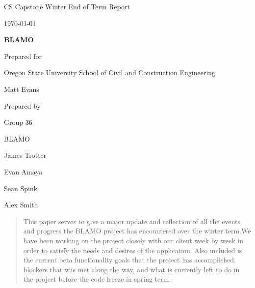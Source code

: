 \documentclass[onecolumn, draftclsnofoot,10pt, compsoc]{IEEEtran}
\def \CapstoneTeamName{         BLAMO}
\def \CapstoneTeamNumber{               36}
\def \GroupMemberOne{                   James Trotter}
\def \GroupMemberTwo{                   Evan Amaya}
\def \GroupMemberThree{                 Sean Spink}
\def \GroupMemberFour{                  Alex Smith}
\def \CapstoneProjectName{              BLAMO}
\def \CapstoneSponsorCompany{   Oregon State University School of Civil and Construction Engineering}
\def \CapstoneSponsorPerson{            Matt Evans}
\def \DocType{          %
                                Winter End of Term Report
                                }
\newcommand{\NameSigPair}[1]{\par
\makebox[2.75in][r]{#1} \hfil   \makebox[3.25in]{\makebox[2.25in]{\hrulefill} \hfill            \makebox[.75in]{\hrulefill}}
\par\vspace{-12pt} \textit{\tiny\noindent
\makebox[2.75in]{} \hfil                \makebox[3.25in]{\makebox[2.25in][r]{Signature} \hfill  \makebox[.75in][r]{Date}}}}
\renewcommand{\NameSigPair}[1]{#1}
\begin{document}
\begin{titlepage}
    \begin{singlespace}
        \hfill
        \par\vspace{.2in}
        \centering
        \scshape{
            \huge CS Capstone \DocType \par
            {\large\today}\par
            \vspace{.5in}
            \textbf{\Huge\CapstoneProjectName}\par
            \vfill
            {\large Prepared for}\par
            \Huge \CapstoneSponsorCompany\par
            \vspace{5pt}
            {\Large\NameSigPair{\CapstoneSponsorPerson}\par}
            {\large Prepared by }\par
Group\CapstoneTeamNumber\par
            \CapstoneTeamName\par
            \vspace{5pt}
            {\Large
                \NameSigPair{\GroupMemberOne}\par
                \NameSigPair{\GroupMemberTwo}\par
                \NameSigPair{\GroupMemberThree}\par
                \NameSigPair{\GroupMemberFour}\par
            }
            \vspace{20pt}
        }
        \begin{abstract}
        This paper serves to give a major update and reflection of all the events and progress the BLAMO project has encountered over the winter term.We have been working on the project closely with our client  week by week in order to satisfy the needs and desires of the application. Also included is the current beta functionality goals that the project has accomplished, blockers that was met along the way, and what is currently left to do in the project before the code freeze in spring term.
        \end{abstract}
    \end{singlespace}
\end{titlepage}
\newpage
{}
\tableofcontents
\clearpage
\end{document}
